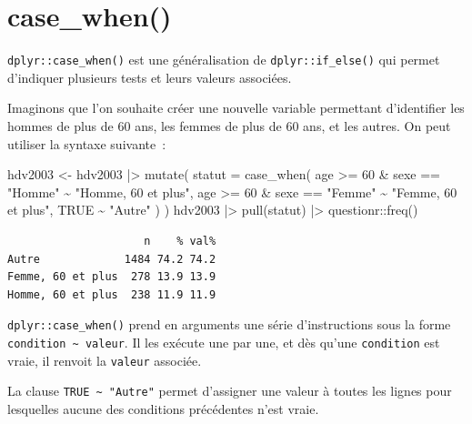 \documentclass[
  letterpaper,
  DIV=11,
  numbers=noendperiod,
  oneside]{scrreprt}
\newenvironment{Shaded}{\begin{snugshade}}{\end{snugshade}}
\newcommand{\AttributeTok}[1]{\textcolor[rgb]{0.40,0.45,0.13}{#1}}
\newcommand{\ConstantTok}[1]{\textcolor[rgb]{0.56,0.35,0.01}{#1}}
\newcommand{\DecValTok}[1]{\textcolor[rgb]{0.68,0.00,0.00}{#1}}
\newcommand{\FunctionTok}[1]{\textcolor[rgb]{0.28,0.35,0.67}{#1}}
\newcommand{\NormalTok}[1]{\textcolor[rgb]{0.00,0.23,0.31}{#1}}
\newcommand{\OtherTok}[1]{\textcolor[rgb]{0.00,0.23,0.31}{#1}}
\newcommand{\SpecialCharTok}[1]{\textcolor[rgb]{0.37,0.37,0.37}{#1}}
\newcommand{\StringTok}[1]{\textcolor[rgb]{0.13,0.47,0.30}{#1}}
\begin{document}
\hypertarget{case_when}{%
\section{case\_when()}\label{case_when}}

\texttt{dplyr::case\_when()} est une généralisation de
\texttt{dplyr::if\_else()} qui permet d'indiquer plusieurs tests et
leurs valeurs associées.

Imaginons que l'on souhaite créer une nouvelle variable permettant
d'identifier les hommes de plus de 60 ans, les femmes de plus de 60 ans,
et les autres. On peut utiliser la syntaxe suivante~:

\begin{Shaded}
\begin{Highlighting}[]
\NormalTok{hdv2003 }\OtherTok{\textless{}{-}}
\NormalTok{  hdv2003 }\SpecialCharTok{|\textgreater{}} 
  \FunctionTok{mutate}\NormalTok{(}
    \AttributeTok{statut =} \FunctionTok{case\_when}\NormalTok{(}
\NormalTok{      age }\SpecialCharTok{\textgreater{}=} \DecValTok{60} \SpecialCharTok{\&}\NormalTok{ sexe }\SpecialCharTok{==} \StringTok{"Homme"} \SpecialCharTok{\textasciitilde{}} \StringTok{"Homme, 60 et plus"}\NormalTok{,}
\NormalTok{      age }\SpecialCharTok{\textgreater{}=} \DecValTok{60} \SpecialCharTok{\&}\NormalTok{ sexe }\SpecialCharTok{==} \StringTok{"Femme"} \SpecialCharTok{\textasciitilde{}} \StringTok{"Femme, 60 et plus"}\NormalTok{,}
      \ConstantTok{TRUE} \SpecialCharTok{\textasciitilde{}} \StringTok{"Autre"}
\NormalTok{    )}
\NormalTok{  )}
\NormalTok{hdv2003 }\SpecialCharTok{|\textgreater{}} 
  \FunctionTok{pull}\NormalTok{(statut) }\SpecialCharTok{|\textgreater{}} 
\NormalTok{  questionr}\SpecialCharTok{::}\FunctionTok{freq}\NormalTok{()}
\end{Highlighting}
\end{Shaded}

\begin{verbatim}
                     n    % val%
Autre             1484 74.2 74.2
Femme, 60 et plus  278 13.9 13.9
Homme, 60 et plus  238 11.9 11.9
\end{verbatim}

\texttt{dplyr::case\_when()} prend en arguments une série d'instructions
sous la forme \texttt{condition\ \textasciitilde{}\ valeur}. Il les
exécute une par une, et dès qu'une \texttt{condition} est vraie, il
renvoit la \texttt{valeur} associée.

La clause \texttt{TRUE\ \textasciitilde{}\ "Autre"} permet d'assigner
une valeur à toutes les lignes pour lesquelles aucune des conditions
précédentes n'est vraie.
\end{document}

